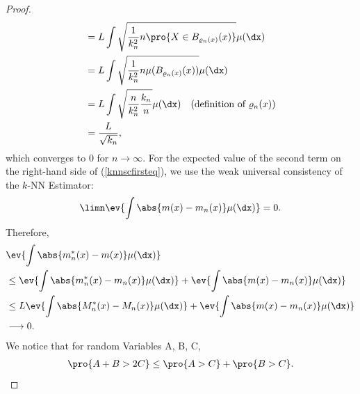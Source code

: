 \begin{proof}
\begin{align*}
        &= L \int \sqrt{\frac{1}{k_n^2}n\pro{X \in B_{\varrho_n(x)}(x)}} \mu(\dx) \\
        &= L \int \sqrt{\frac{1}{k_n^2}n\mu(B_{\varrho_n(x)}(x))} \mu(\dx)  \\
        &= L \int \sqrt{\frac{n}{k_n^2} \frac{k_n}{n}} \mu(\dx) \quad \text{(definition of \(\varrho_n(x)\))} \\
        &= \frac{L}{\sqrt{k_n}},
    \end{align*}
    which converges to \(0\) for \(n \to \infty\). For the expected value of the second term on the right-hand side of (\ref{knnscfirsteq}), we use the weak universal consistency of the $k$-NN Estimator:
    \[
        \limn \ev{\int \abs{m(x) - m_n(x)} \mu(\dx)} = 0.
    \]
    Therefore,
    \begin{align} \label{knnmodifiedconvergence}
        &\ev{\int \abs{m_n^*(x) - m(x)} \mu(\dx)} \\
        &\leq \ev{\int \abs{m_n^*(x) - m_n(x)} \mu(\dx)} + \ev{\int \abs{m(x)- m_n(x)} \mu(\dx)} \nonumber \\
        &\leq L \ev{\int \abs{M_n^*(x) - M_n(x)} \mu(\dx)} + \ev{\int \abs{m(x)- m_n(x)} \mu(\dx)} \nonumber \\
        &\longrightarrow 0 \nonumber.
    \end{align}
    We notice that for random Variables A, B, C,
    \begin{align} \label{probeq2}
        \pro{A + B > 2C} \leq \pro{A > C} + \pro{B > C}.
    \end{align}
   

\end{proof}
